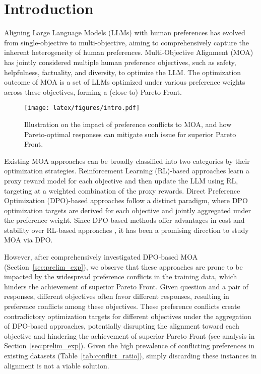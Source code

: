 \section{Introduction}
Aligning Large Language Models (LLMs) with human preferences \cite{DBLP:conf/nips/Ouyang0JAWMZASR22, DBLP:conf/nips/RafailovSMMEF23} has evolved from single-objective to multi-objective, aiming to comprehensively capture the inherent heterogeneity of human preferences.
Multi-Objective Alignment (MOA) \cite{DBLP:conf/nips/RameCDGSSC23, DBLP:conf/acl/WangLXYDQZZ24, DBLP:journals/corr/abs-2402-02030} has jointly considered multiple human preference objectives, such as safety, helpfulness, factuality, and diversity, to optimize the LLM. 
The optimization outcome of MOA is a set of LLMs optimized under various preference weights across these objectives, forming a (close-to) Pareto Front. 
 

\begin{figure}[ht]
    \centering
    \setlength{\abovecaptionskip}{0.05cm}
    \setlength{\belowcaptionskip}{0cm}
    \texttt{[image: latex/figures/intro.pdf]}
    \caption{Illustration on the impact of preference conflicts to MOA, and how Pareto-optimal responses can mitigate such issue for superior Pareto Front. }
    \label{fig:intro}
\end{figure}

Existing MOA approaches can be broadly classified into two categories by their optimization strategies. 
Reinforcement Learning (RL)-based approaches \cite{DBLP:conf/nips/RameCDGSSC23, DBLP:conf/acl/WangLXYDQZZ24} learn a proxy reward model for each objective and then update the LLM using RL, targeting at a weighted combination of the proxy rewards. 
Direct Preference Optimization (DPO)-based approaches \cite{DBLP:conf/acl/ZhouLS00O024} 
follow a distinct paradigm, 
where DPO optimization targets are derived for each objective and jointly aggregated under the preference weight. 
Since DPO-based methods offer advantages in cost and stability over RL-based approaches \cite{DBLP:conf/nips/RafailovSMMEF23}, it has been a promising direction to study MOA via DPO. 


However, after comprehensively investigated DPO-based MOA (\cf Section~\ref{sec:prelim_exp}), we observe that these approaches are prone to be impacted by the widespread preference conflicts in the training data, which hinders the achievement of superior Pareto Front. 
Given question and a pair of responses, different objectives often favor different responses, resulting in preference conflicts among these objectives. 
These preference conflicts create contradictory optimization targets for different objectives under the aggregation of DPO-based approaches, potentially disrupting the alignment toward each objective and hindering the achievement of superior Pareto Front (see analysis in Section~\ref{sec:prelim_exp}). 
Given the high prevalence of conflicting preferences in existing datasets (\cf Table~\ref{tab:conflict_ratio}), simply discarding these instances in alignment is not a viable solution.


